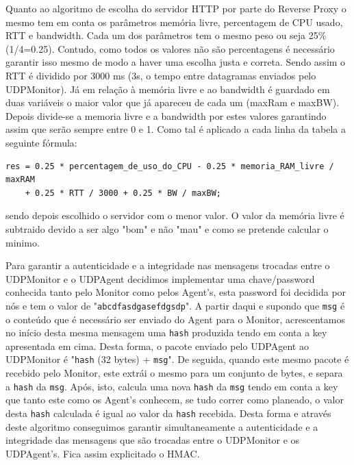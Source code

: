 \documentclass{article}
\begin{document}
Quanto ao algoritmo de escolha do servidor HTTP por parte do Reverse Proxy o mesmo tem em conta os parâmetros memória livre, percentagem de CPU usado, RTT e bandwidth. Cada um dos parâmetros tem o mesmo peso ou seja 25\%(1/4=0.25). Contudo, como todos os valores não são percentagens é necessário garantir isso mesmo de modo a haver uma escolha justa e correta. Sendo assim o RTT é dividido por 3000 ms (3s, o tempo entre datagramas enviados pelo UDPMonitor). Já em relação à memória livre e ao bandwidth é guardado em duas variáveis o maior valor que já apareceu de cada um (maxRam e maxBW). Depois divide-se a memoria livre e a bandwidth por estes valores garantindo assim que serão sempre entre 0 e 1. Como tal é aplicado a cada linha da tabela a seguinte fórmula:
\begin{verbatim}
res = 0.25 * percentagem_de_uso_do_CPU - 0.25 * memoria_RAM_livre / maxRAM 
	+ 0.25 * RTT / 3000 + 0.25 * BW / maxBW;
\end{verbatim}
sendo depois escolhido o servidor com o menor valor. O valor da memória livre é subtraido devido a ser algo "bom" e não "mau" e como se pretende calcular o minimo.

Para garantir a autenticidade e a integridade nas mensagens trocadas entre o UDPMonitor e o UDPAgent decidimos implementar uma chave/password conhecida tanto pelo Monitor como pelos Agent's, esta password foi decidida por nós e tem o valor de "\texttt{abcdfasdgasefdgsdp}". A partir daqui e supondo que \texttt{msg} é o conteúdo que é necessário ser enviado do Agent para o Monitor, acrescentamos no início desta mesma mensagem uma \texttt{hash} produzida tendo em conta a key apresentada em cima. Desta forma, o pacote enviado pelo UDPAgent ao UDPMonitor é "\texttt{hash} (32 bytes) + \texttt{msg}". De seguida, quando este mesmo pacote é recebido pelo Monitor, este extrái o mesmo para um conjunto de bytes, e separa a \texttt{hash} da \texttt{msg}. Após, isto, calcula uma nova \texttt{hash} da \texttt{msg} tendo em conta a key que tanto este como os Agent's conhecem, se tudo correr como planeado, o valor desta \texttt{hash} calculada é igual ao valor da \texttt{hash} recebida.
Desta forma e através deste algoritmo conseguimos garantir simultaneamente a autenticidade e a integridade das mensagens que são trocadas entre o UDPMonitor e os UDPAgent's. Fica assim explicitado o HMAC.
\end{document}
